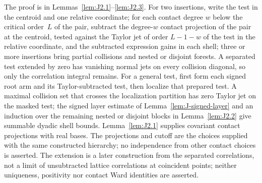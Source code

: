 The proof is in Lemmas~\ref{lem:J2.1}--\ref{lem:J2.3}. For two insertions, write the test in the centroid and one relative coordinate; for each contact degree $w$ below the critical order~$L$ of the pair, subtract the degree-$w$ contact projection of the pair at the centroid, tested against the Taylor jet of order $L-1-w$ of the test in the relative coordinate, and the subtracted expression gains in each shell; three or more insertions bring partial collisions and nested or disjoint forests. A separated test extended by zero has vanishing normal jets on every collision diagonal, so only the correlation integral remains. For a general test, first form each signed root arm and its Taylor-subtracted test, then localize that prepared test. A maximal collision set that crosses the localization partition has zero Taylor jet on the masked test; the signed layer estimate of Lemma~\ref{lem:J-signed-layer} and an induction over the remaining nested or disjoint blocks in Lemma~\ref{lem:J2.2} give summable dyadic shell bounds. Lemma~\ref{lem:J2.1} supplies covariant contact projections with real bases. The projections and cutoff are the choices supplied with the same constructed hierarchy; no independence from other contact choices is asserted. The extension is a later construction from the separated correlations, not a limit of unsubtracted lattice correlations at coincident points; neither uniqueness, positivity nor contact Ward identities are asserted.
